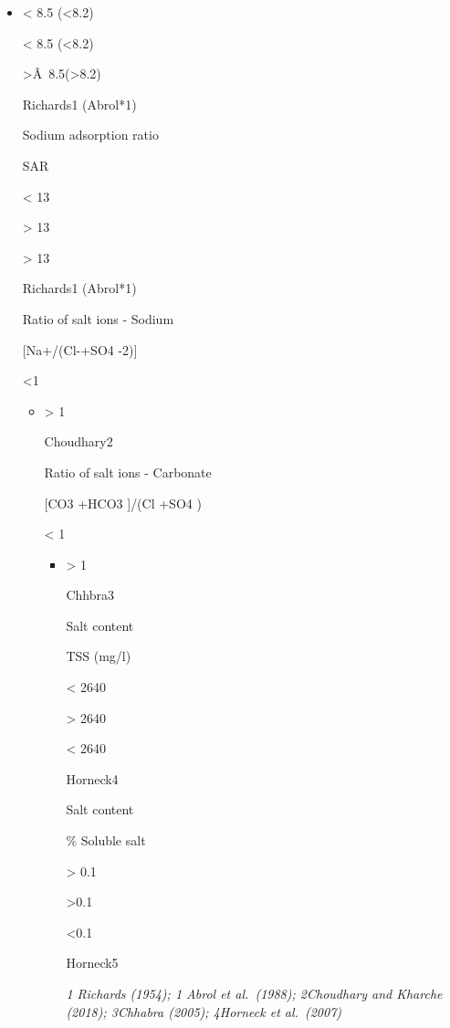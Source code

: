\documentclass[
  10pt,
  b5paper,
]{book}
\begin{document}
\begin{itemize}
\item
  \textless{} 8.5 (\textless8.2)

  \textless{} 8.5 (\textless8.2)

  \textgreater Â~8.5(\textgreater8.2)

  Richards1 (Abrol*1)

  Sodium adsorption ratio

  SAR

  \textless{} 13

  \textgreater{} 13

  \textgreater{} 13

  Richards1 (Abrol*1)

  Ratio of salt ions - Sodium

  {[}Na+/(Cl-+SO4 -2){]}

  \textless1

  \begin{itemize}
  \item
    \textgreater{} 1

    Choudhary2

    Ratio of salt ions -
    Carbonate

    {[}CO3 +HCO3 {]}/(Cl +SO4 )

    \textless{} 1

    \begin{itemize}
    \item
      \textgreater{} 1

      Chhbra3

      Salt content

      TSS (mg/l)

      \textless{} 2640

      \textgreater{} 2640

      \textless{} 2640

      Horneck4

      Salt content

      \% Soluble salt

      \textgreater{} 0.1

      \textgreater0.1

      \textless0.1

      Horneck5

      \emph{1 Richards (1954); 1 Abrol et al.~(1988); 2Choudhary and Kharche (2018); 3Chhabra (2005); 4Horneck et al.~(2007)}
    \end{itemize}
  \end{itemize}
\end{itemize}
\end{document}
